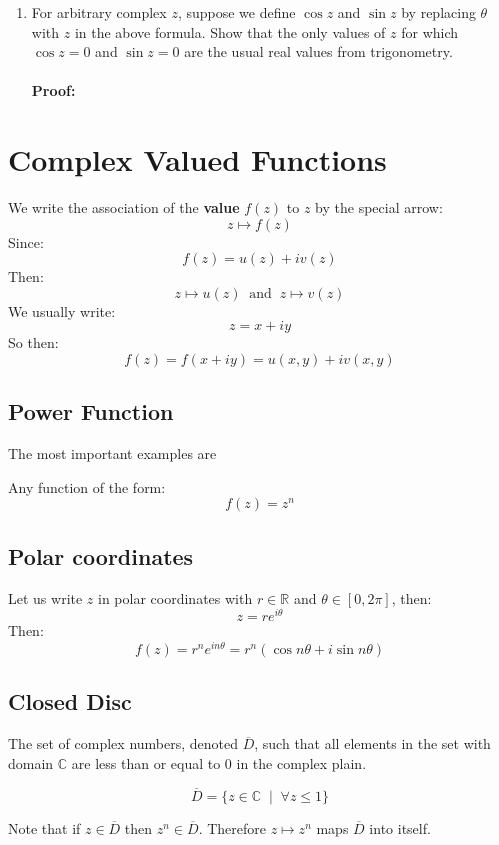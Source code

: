 \begin{enumerate}
\begin{enumerate}
		\item For arbitrary complex $z$, suppose we define $\cos{z}$ and $\sin{z}$ by replacing $\theta$ with $z$ in the above formula. Show that the only values of $z$ for which $\cos{z} = 0$ and $\sin{z} = 0$ are the usual real values from trigonometry. \\
		\\
		\textbf{Proof:}
	\end{enumerate}
\end{enumerate}

\section{Complex Valued Functions}
We write the association of the \textbf{value} $f(z)$ to $z$ by the special arrow:
\[z \mapsto f(z) \]
Since:
\[f(z) = u(z) +iv(z)\]
Then:
\[z \mapsto u(z) \;\; \text{and} \;\;  z \mapsto v(z) \]
We usually write:
\[z = x + iy\]
So then:
\[f(z) = f(x + iy) = u(x,y) + iv(x,y)\]

\subsection{Power Function}
The most important examples are 
\begin{defn}
Any function of the form:
	\[f(z) = z^n\]
\end{defn}
\subsection{Polar coordinates}
Let us write $z$ in polar coordinates with $r \in \mathbb{R}$ and $\theta \in [0, 2\pi]$, then:
\[ z = re^{i\theta}\]
Then:
\[f(z) = r^ne^{in\theta} = r^n(\cos{n\theta} + i\sin{n\theta})\]

\subsection{Closed Disc}
The set of complex numbers, denoted $\overline{D}$, such that all elements in the set with domain $\mathbb{C}$ are less than or equal to $0$ in the complex plain.
\begin{defn}
	\[\overline{D} = \{z \in \mathbb{C} \;\;|\;\; \forall z \leq 1 \} \]
\end{defn}
Note that if $z \in \overline{D}$ then $z^n \in \overline{D}$. Therefore $z \mapsto z^n$ maps $\overline{D}$ into itself. \\

